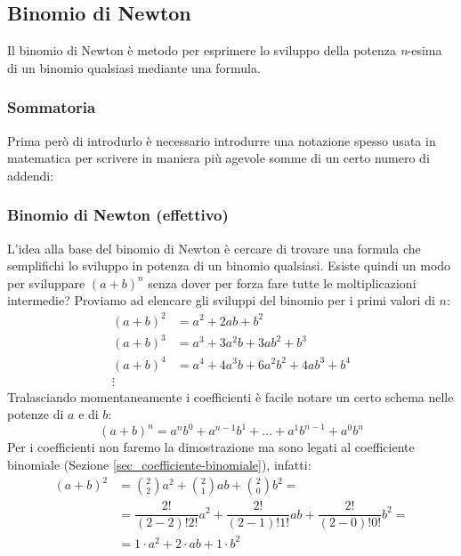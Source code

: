 \subsection{Binomio di Newton} \label{sec_binomioNewton}
Il binomio di Newton è metodo per esprimere lo sviluppo della potenza 
\textit{n}-esima di un binomio qualsiasi mediante una formula.
\subsubsection{Sommatoria} \label{sec_sommatoria}
Prima però di introdurlo è necessario introdurre una notazione spesso usata in 
matematica per scrivere in maniera più agevole somme di un certo numero di 
addendi:

\subsubsection{Binomio di Newton (effettivo)}
L'idea alla base del binomio di Newton è cercare di trovare una formula che 
semplifichi lo sviluppo in potenza di un binomio qualsiasi. Esiste quindi un 
modo per sviluppare $(a+b)^n$ senza dover per forza fare tutte le 
moltiplicazioni intermedie? Proviamo ad elencare gli sviluppi del binomio per i 
primi valori di $n$:
\begin{align*}
    (a+b)^2 &= a^2 + 2ab + b^2\\
    (a+b)^3 &= a^3 + 3a^2b + 3ab^2 + b^3\\
    (a+b)^4 &= a^4 + 4a^3b + 6a^2b^2 + 4ab^3 + b^4\\
    \vdots \qquad
\end{align*}
Tralasciando momentaneamente i coefficienti è facile notare un certo schema 
nelle potenze di $a$ e di $b$:
\begin{equation*}
    (a+b)^n = a^nb^0 + a^{n-1}b^1 + \dots + a^1b^{n-1} + a^0b^n
\end{equation*}
Per i coefficienti non faremo la dimostrazione ma sono legati al coefficiente 
binomiale (Sezione \ref{sec_coefficiente-binomiale}), infatti:
\begin{align*}
    (a+b)^2 &= \binom{2}{2}a^2 + \binom{2}{1}ab + \binom{2}{0}b^2 = \\[2pt]
    &= \dfrac{2!}{(2-2)!2!}a^2 + \dfrac{2!}{(2-1)!1!}ab + 
    \dfrac{2!}{(2-0)!0!}b^2 =\\[5pt]
    &= 1\cdot a^2 + 2\cdot ab + 1 \cdot b^2
\end{align*}

